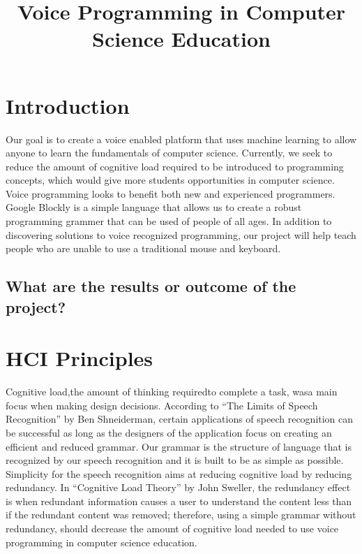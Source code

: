 \documentclass[]{article}
\title{Voice Programming in Computer Science Education}
\begin{document}
\maketitle

\section{Introduction}

Our goal is to create a voice enabled platform that uses machine learning to allow 
anyone to learn the fundamentals of computer science. Currently, we seek to reduce the amount
of cognitive load required to be introduced to programming concepts, which would give more 
students opportunities in computer science. 
\\ 
Voice programming looks to benefit both new and experienced programmers.  
Google Blockly is a simple language that allows us to create a robust programming grammer 
that can be used of people of all ages. In addition to discovering solutions to voice 
recognized programming, our project will help teach people who are unable to use a traditional mouse and keyboard.

\subsection{What are the results or outcome of the project?}

\section{HCI Principles}

Cognitive load,the amount of thinking requiredto complete a task, wasa main focus when
making design decisions. According to “The Limits of Speech Recognition” by Ben Shneiderman, certain
applications of speech recognition can be successful as long as the designers of the application 
focus on creating an efficient and reduced grammar. Our grammar is the structure of language that is 
recognized by our speech recognition and it is built to be as simple as possible. Simplicity for the
speech recognition aims at reducing cognitive load by reducing redundancy. In “Cognitive Load Theory”
by John Sweller, the redundancy effect is when redundant information causes a user to understand the content
less than if the redundant content was removed; therefore, using a simple grammar without redundancy,
should decrease the amount of cognitive load needed to use voice programming in computer science education.
\end{document}
